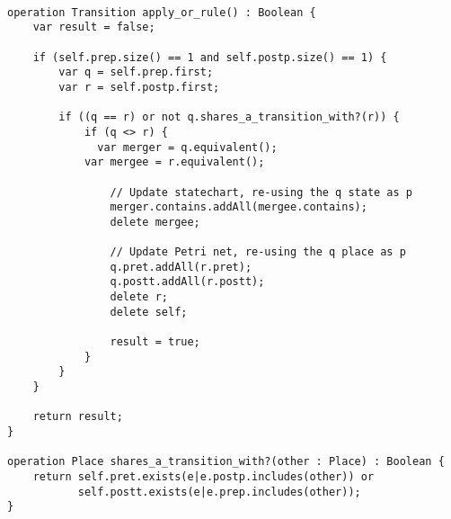 
\tt
\begin{lstlisting}
operation Transition apply_or_rule() : Boolean {
	var result = false;
	
	if (self.prep.size() == 1 and self.postp.size() == 1) {
		var q = self.prep.first;
		var r = self.postp.first;
	
		if ((q == r) or not q.shares_a_transition_with?(r)) {		
			if (q <> r) {
			  var merger = q.equivalent();
  			var mergee = r.equivalent();
  			
				// Update statechart, re-using the q state as p
				merger.contains.addAll(mergee.contains);	
				delete mergee;
				
				// Update Petri net, re-using the q place as p
				q.pret.addAll(r.pret);
				q.postt.addAll(r.postt);
				delete r;
				delete self;
				
				result = true;
			}
		}
	}

	return result;
}

operation Place shares_a_transition_with?(other : Place) : Boolean {
	return self.pret.exists(e|e.postp.includes(other)) or 
	       self.postt.exists(e|e.prep.includes(other));
}

\end{lstlisting}